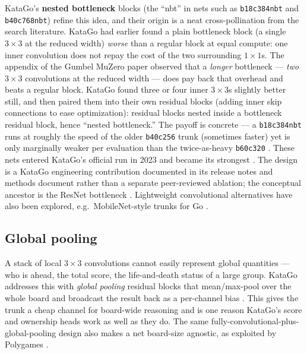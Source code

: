 \documentclass[11pt]{article}
\begin{document}
KataGo's \textbf{nested bottleneck} blocks (the ``nbt'' in nets such as
\texttt{b18c384nbt} and \texttt{b40c768nbt}) refine this idea, and their origin is a neat
cross-pollination from the search literature. KataGo had earlier found a plain bottleneck
block (a single $3\times3$ at the reduced width) \emph{worse} than a regular block at equal
compute: one inner convolution does not repay the cost of the two surrounding $1\times1$s.
The appendix of the Gumbel MuZero paper \cite{gumbel2022} observed that a \emph{longer}
bottleneck --- \emph{two} $3\times3$ convolutions at the reduced width --- does pay back that
overhead and beats a regular block. KataGo found three or four inner $3\times3$s slightly
better still, and then paired them into their own residual blocks (adding inner skip
connections to ease optimization): residual blocks nested inside a bottleneck residual
block, hence ``nested bottleneck.'' The payoff is concrete --- a \texttt{b18c384nbt} runs at
roughly the speed of the older \texttt{b40c256} trunk (sometimes faster) yet is only
marginally weaker per evaluation than the twice-as-heavy \texttt{b60c320} \cite{katagomethods}.
These nets entered KataGo's official run in 2023 and became its strongest \cite{katago112}.
The design is a KataGo engineering contribution documented in its release notes and methods
document rather than a separate peer-reviewed ablation; the conceptual ancestor is the ResNet
bottleneck \cite{resnet2016}. Lightweight convolutional alternatives have also been explored,
e.g.\ MobileNet-style trunks for Go \cite{mobilego2020}.

\subsection{Global pooling}
A stack of local $3\times3$ convolutions cannot easily represent global quantities --- who
is ahead, the total score, the life-and-death status of a large group. KataGo addresses
this with \emph{global pooling} residual blocks that mean/max-pool over the whole board and
broadcast the result back as a per-channel bias \cite{katago2019}. This gives the trunk a
cheap channel for board-wide reasoning and is one reason KataGo's score and ownership heads
work as well as they do. The same fully-convolutional-plus-global-pooling design also makes a
net board-size agnostic, as exploited by Polygames \cite{polygames2020}.
\end{document}
